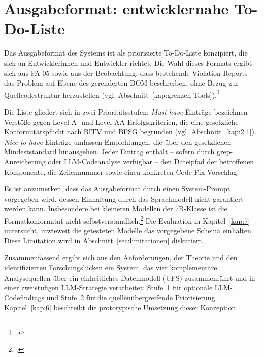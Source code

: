 \section{Ausgabeformat: entwicklernahe To-Do-Liste}
\label{sec:ausgabeformat}

Das Ausgabeformat des Systems ist als priorisierte To-Do-Liste konzipiert, die sich an Entwicklerinnen und Entwickler richtet. Die Wahl dieses Formats ergibt sich aus \ac{FA}-05 sowie aus der Beobachtung, dass bestehende Violation Reports das Problem auf Ebene des gerenderten \ac{DOM} beschreiben, ohne Bezug zur Quellcodestruktur herzustellen (vgl. Abschnitt~\ref{kap:grenzen Tools}).\footcite[Vgl.][]{fathallah_accessguru_2025}

Die Liste gliedert sich in zwei Prioritätsstufen: \emph{Must-have}-Einträge bezeichnen Verstöße gegen Level-A- und Level-AA-Erfolgskriterien, die eine gesetzliche Konformitätspflicht nach \ac{BITV} und \ac{BFSG} begründen (vgl. Abschnitt~\ref{kap:2.1}). \emph{Nice-to-have}-Einträge umfassen Empfehlungen, die über den gesetzlichen Mindeststandard hinausgehen. Jeder Eintrag enthält -- sofern durch grep-Anreicherung oder LLM-Codeanalyse verfügbar -- den Dateipfad der betroffenen Komponente, die Zeilennummer sowie einen konkreten Code-Fix-Vorschlag.

Es ist anzumerken, dass das Ausgabeformat durch einen System-Prompt vorgegeben wird, dessen Einhaltung durch das Sprachmodell nicht garantiert werden kann. Insbesondere bei kleineren Modellen der 7B-Klasse ist die Formatkonformität nicht selbstverständlich.\footcite[Vgl.][S.~5]{brown2020gpt3fewshot} Die Evaluation in Kapitel~\ref{kap:7} untersucht, inwieweit die getesteten Modelle das vorgegebene Schema einhalten. Diese Limitation wird in Abschnitt~\ref{sec:limitationen} diskutiert.


Zusammenfassend ergibt sich aus den Anforderungen, der Theorie und den identifizierten Forschungslücken ein System, das vier komplementäre Analysequellen über ein einheitliches Datenmodell (\ac{UFS}) zusammenführt und in einer zweistufigen \ac{LLM}-Strategie verarbeitet: Stufe~1 für optionale LLM-Codefindings und Stufe~2 für die quellenübergreifende Priorisierung. Kapitel~\ref{kap:6} beschreibt die prototypische Umsetzung dieser Konzeption.

